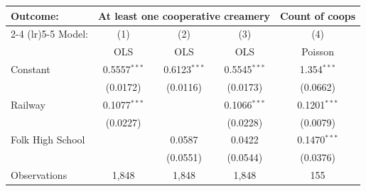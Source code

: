 
\begin{tabular}{lcccc}
   \tabularnewline \midrule \midrule
   Outcome: & \multicolumn{3}{c}{At least one cooperative creamery} & Count of coops \\ \cmidrule(lr){2-4} \cmidrule(lr){5-5}
   Model:           & (1)            & (2)            & (3)            & (4)\\  
                    &  OLS           & OLS            & OLS            & Poisson\\  
      \midrule
   Constant         & 0.5557$^{***}$ & 0.6123$^{***}$ & 0.5545$^{***}$ & 1.354$^{***}$\\   
                    & (0.0172)       & (0.0116)       & (0.0173)       & (0.0662)\\   
   Railway          & 0.1077$^{***}$ &                & 0.1066$^{***}$ & 0.1201$^{***}$\\   
                    & (0.0227)       &                & (0.0228)       & (0.0079)\\   
   Folk High School &                & 0.0587         & 0.0422         & 0.1470$^{***}$\\   
                    &                & (0.0551)       & (0.0544)       & (0.0376)\\   
      \midrule
   Observations     & 1,848          & 1,848          & 1,848          & 155\\  
      \midrule
      \midrule
\end{tabular}


